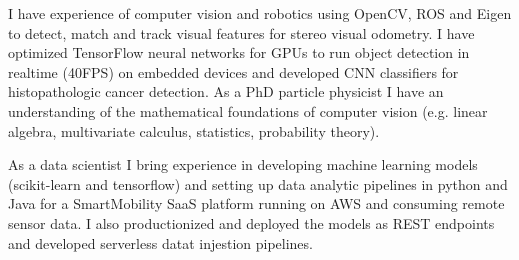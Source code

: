 \documentclass[11pt, a4paper]{awesome-cv}
\begin{document}
\begin{cvletter}
I have experience of computer vision and robotics using OpenCV, ROS and Eigen to detect, match and track 
visual features for stereo visual odometry. 
I have optimized TensorFlow neural networks for GPUs
to run object detection in realtime (40FPS) on embedded devices and developed
CNN classifiers for histopathologic cancer detection.
As a PhD particle physicist I have an understanding of the mathematical foundations of 
computer vision 
(e.g. linear algebra, multivariate calculus, statistics, probability theory).

As a data scientist I bring experience in developing machine learning 
models (scikit-learn and tensorflow) and setting up data analytic pipelines in python and Java 
for a SmartMobility SaaS platform running on AWS and consuming remote sensor data. 
I also productionized and deployed the models as REST endpoints and developed serverless datat 
injestion pipelines.

\end{cvletter}


\makeletterclosing
\end{document}
